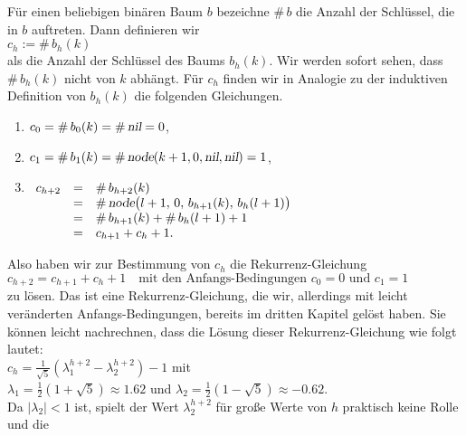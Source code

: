 F\"ur einen beliebigen bin\"aren Baum $b$ bezeichne $\#\,b$ die Anzahl der Schl\"ussel, die in
$b$ auftreten.  Dann definieren wir 
\\[0.2cm]
\hspace*{1.3cm}
$c_h := \#\, b_h(k)$
\\[0.2cm]
als die Anzahl der Schl\"ussel des Baums $b_h(k)$.  Wir werden sofort sehen, dass
$\#\,b_h(k)$ nicht von $k$ abh\"angt.  F\"ur $c_h$ finden wir in Analogie zu
der induktiven Definition von $b_h(k)$ die folgenden Gleichungen.
\begin{enumerate}
\item $c_0 = \#\, b_0(k) = \#\, \textsl{nil} = 0$,
\item $c_1 = \#\, b_1(k) = \#\, \textsl{node}(k+1,0,\textsl{nil}, \textsl{nil}) = 1$, 
\item$\begin{array}[t]{lcl}
       c_{h+2} & = & \#\, b_{h+2}(k) \\
               & = & \#\,\textsl{node}\bigl(l+1,\,0,\,b_{h+1}(k),\,b_h(l+1)\bigr) \\
               & = & \#\, b_{h+1}(k) + \#\, b_h(l+1) + 1 \\
               & = & c_{h+1} + c_h + 1.
       \end{array}$
\end{enumerate}
Also haben wir zur Bestimmung von $c_h$ die Rekurrenz-Gleichung
\\[0.2cm]
\hspace*{1.3cm}
$c_{h+2} = c_{h+1} + c_h + 1 \quad \mbox{mit den Anfangs-Bedingungen $c_0 = 0$ und $c_1 = 1$}$
\\[0.2cm]
zu l\"osen.  Das ist eine Rekurrenz-Gleichung,
die wir, allerdings mit leicht ver\"anderten Anfangs-Bedingungen, bereits im dritten Kapitel gel\"ost haben.
Sie k\"onnen leicht nachrechnen, dass die L\"osung dieser Rekurrenz-Gleichung wie folgt
lautet: 
\\[0.2cm]
\hspace*{1.3cm}
$c_h = \displaystyle \frac{1}{\sqrt{5}} \left( \lambda_1^{h+2} - \lambda_2^{h+2} \right) -
1$  \quad mit
\\[0.2cm]
\hspace*{1.3cm}
$\lambda_1 = \displaystyle \frac{1}{2}(1 + \sqrt{5}) \approx  1.62$ \quad und \quad $\lambda_2 =
\displaystyle \frac{1}{2}(1 - \sqrt{5}) \approx -0.62$.
\\[0.2cm]
Da $|\lambda_2| < 1$ ist, spielt der Wert $\displaystyle\lambda_2^{h+2}$
f\"ur gro{\ss}e Werte von $h$   praktisch keine Rolle und die
